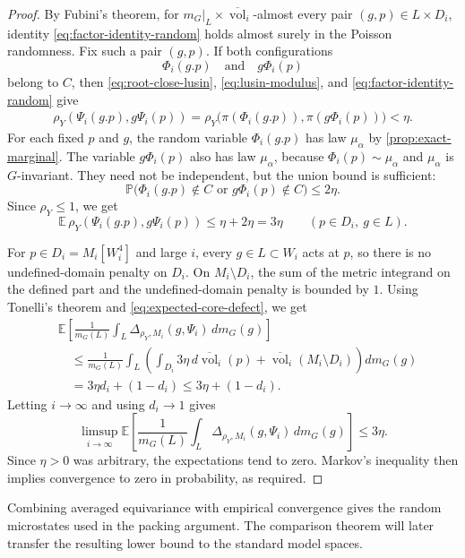 \documentclass[12pt]{amsart}
\theoremstyle{definition}
\newcommand{\Haar}{m_G}
\newcommand{\vol}{\operatorname{vol}}
\newcommand{\1}{\mathbf 1}
\newcommand{\dbar}{\overline{\vol}}
\begin{document}
\begin{proof}
By Fubini's theorem, for $\Haar|_L\times\dbar_i$-almost every pair $(g,p)\in L\times D_i$, identity \eqref{eq:factor-identity-random} holds almost surely in the Poisson randomness. Fix such a pair $(g,p)$. If both configurations
\[
 \Phi_i(g.p)\quad\text{and}\quad g\Phi_i(p)
\]
belong to $C$, then \eqref{eq:root-close-lusin}, \eqref{eq:lusin-modulus}, and \eqref{eq:factor-identity-random} give
\begin{align*}
 \rho_Y(\Psi_i(g.p),g\Psi_i(p))
 =\rho_Y\bigl(\pi(\Phi_i(g.p)),\pi(g\Phi_i(p))\bigr)<\eta.
\end{align*}
For each fixed $p$ and $g$, the random variable $\Phi_i(g.p)$ has law $\mu_\alpha$ by \cref{prop:exact-marginal}. The variable $g\Phi_i(p)$ also has law $\mu_\alpha$, because $\Phi_i(p)\sim\mu_\alpha$ and $\mu_\alpha$ is $G$-invariant. They need not be independent, but the union bound is sufficient:
\[
 \mathbb P\bigl(\Phi_i(g.p)\notin C
 \text{ or }g\Phi_i(p)\notin C\bigr)
 \leq2\eta.
\]
Since $\rho_Y\leq1$, we get
\begin{equation}\label{eq:expected-core-defect}
 \mathbb E\,\rho_Y(\Psi_i(g.p),g\Psi_i(p))
 \leq \eta+2\eta=3\eta
 \qquad(p\in D_i,\ g\in L).
\end{equation}

For $p\in D_i=M_i[W_i^4]$ and large $i$, every $g\in L\subset W_i$ acts at $p$, so there is no undefined-domain penalty on $D_i$. On $M_i\setminus D_i$, the sum of the metric integrand on the defined part and the undefined-domain penalty is bounded by $1$. Using Tonelli's theorem and \eqref{eq:expected-core-defect}, we get
\begin{align*}
 &\mathbb E\left[
 \frac1{\Haar(L)}\int_L
 \Delta_{\rho_Y,M_i}(g,\Psi_i)\,d\Haar(g)
 \right]\\
 &\quad\leq
 \frac1{\Haar(L)}\int_L
 \left(\int_{D_i}3\eta\,d\dbar_i(p)
 +\dbar_i(M_i\setminus D_i)\right)d\Haar(g)\\
 &\quad=3\eta d_i+(1-d_i)
 \leq3\eta+(1-d_i).
\end{align*}
Letting $i\to\infty$ and using $d_i\to1$ gives
\[
 \limsup_{i\to\infty}
 \mathbb E\left[
 \frac1{\Haar(L)}\int_L
 \Delta_{\rho_Y,M_i}(g,\Psi_i)\,d\Haar(g)
 \right]
 \leq3\eta.
\]
Since $\eta>0$ was arbitrary, the expectations tend to zero. Markov's inequality then implies convergence to zero in probability, as required.
\end{proof}

Combining averaged equivariance with empirical convergence gives the random microstates used in the packing argument. The comparison theorem will later transfer the resulting lower bound to the standard model spaces.
\end{document}
